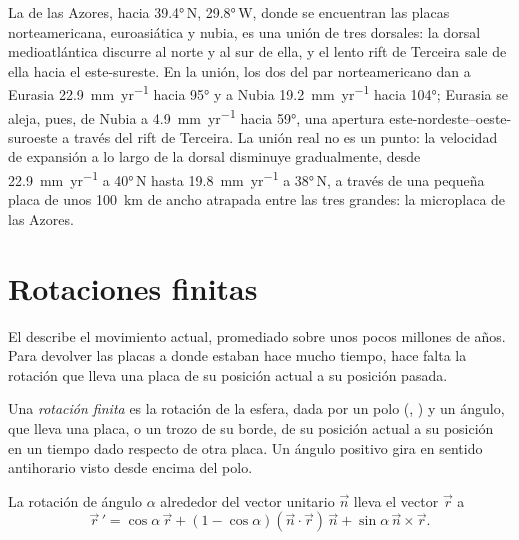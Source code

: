 La  de las Azores, hacia \ang{39.4}\,N, \ang{29.8}\,W, donde se encuentran las placas norteamericana, euroasiática y nubia,
es una unión de tres dorsales: la dorsal medioatlántica discurre al norte y al sur de ella, y el lento rift de Terceira
sale de ella hacia el este-sureste. En la unión, los dos  del par norteamericano dan a Eurasia \qty{22.9}{mm.yr^{-1}}
hacia \ang{95} y a Nubia \qty{19.2}{mm.yr^{-1}} hacia \ang{104}; Eurasia se aleja, pues, de Nubia a \qty{4.9}{mm.yr^{-1}} hacia
\ang{59}, una apertura este-nordeste--oeste-suroeste a través del rift de Terceira. La unión real no es un punto: la velocidad de
expansión a lo largo de la dorsal disminuye gradualmente, desde \qty{22.9}{mm.yr^{-1}} a \ang{40}\,N hasta \qty{19.8}{mm.yr^{-1}} a
\ang{38}\,N, a través de una pequeña placa de unos \qty{100}{km} de ancho atrapada entre las tres grandes: la microplaca de las Azores.

\section{Rotaciones finitas}

El  describe el movimiento actual, promediado sobre unos pocos millones de años. Para devolver las placas a donde
estaban hace mucho tiempo, hace falta la rotación que lleva una placa de su posición actual a su posición pasada.

\begin{definition}\label{def:b1:plate-kinematics:finite-rotation}
Una \emph{rotación finita} es la rotación de la esfera, dada por un polo (, ) y un ángulo, que
lleva una placa, o un trozo de su borde, de su posición actual a su posición en un tiempo dado respecto de otra placa. Un ángulo
positivo gira en sentido antihorario visto desde encima del polo.
\end{definition}

\begin{proposition}\label{prop:b1:plate-kinematics:rodrigues}
La rotación de ángulo $\alpha$ alrededor del vector unitario $\vec n$ lleva el
vector $\vec r$ a
\[
  \vec r\,' = \cos\alpha\,\vec r + (1 - \cos\alpha)(\vec n\cdot\vec r)\,\vec n
  + \sin\alpha\,\vec n\times\vec r .
\]
\end{proposition}

